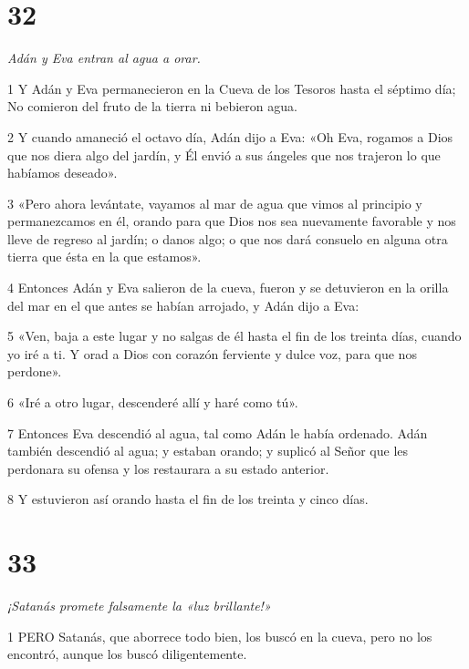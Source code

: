 \chapter{32}

\par \textit{Adán y Eva entran al agua a orar.}

\par 1 Y Adán y Eva permanecieron en la Cueva de los Tesoros hasta el séptimo día; No comieron del fruto de la tierra ni bebieron agua.

\par 2 Y cuando amaneció el octavo día, Adán dijo a Eva: «Oh Eva, rogamos a Dios que nos diera algo del jardín, y Él envió a sus ángeles que nos trajeron lo que habíamos deseado».

\par 3 «Pero ahora levántate, vayamos al mar de agua que vimos al principio y permanezcamos en él, orando para que Dios nos sea nuevamente favorable y nos lleve de regreso al jardín; o danos algo; o que nos dará consuelo en alguna otra tierra que ésta en la que estamos».

\par 4 Entonces Adán y Eva salieron de la cueva, fueron y se detuvieron en la orilla del mar en el que antes se habían arrojado, y Adán dijo a Eva:

\par 5 «Ven, baja a este lugar y no salgas de él hasta el fin de los treinta días, cuando yo iré a ti. Y orad a Dios con corazón ferviente y dulce voz, para que nos perdone».

\par 6 «Iré a otro lugar, descenderé allí y haré como tú».

\par 7 Entonces Eva descendió al agua, tal como Adán le había ordenado. Adán también descendió al agua; y estaban orando; y suplicó al Señor que les perdonara su ofensa y los restaurara a su estado anterior.

\par 8 Y estuvieron así orando hasta el fin de los treinta y cinco días.

\chapter{33}

\par \textit{¡Satanás promete falsamente la «luz brillante!»}

\par 1 PERO Satanás, que aborrece todo bien, los buscó en la cueva, pero no los encontró, aunque los buscó diligentemente.

